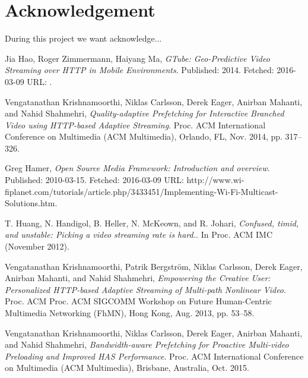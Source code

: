 \documentclass[9pt,a4paper]{acmproc}
\begin{document}
\section{Acknowledgement}
During this project we want acknowledge...

\clearpage
\begin{thebibliography}{9}

  Jia Hao, Roger Zimmermann, Haiyang Ma,
  \emph{GTube: Geo-Predictive Video Streaming over HTTP in Mobile Environments}.
  \newline
  Published: 2014. Fetched: 2016-03-09 
  \newline
	URL: .

  Vengatanathan Krishnamoorthi, Niklas Carlsson, Derek Eager, Anirban 
Mahanti, and Nahid Shahmehri,
  \emph{Quality-adaptive Prefetching for Interactive 
Branched Video using HTTP-based Adaptive Streaming}.
  \newline
  Proc. ACM 
International Conference on Multimedia (ACM Multimedia), Orlando, FL, Nov. 2014, pp. 317--326.

  Greg Hamer,
  \emph{Open Source Media Framework: Introduction and overview}.
  \newline
  Published: 2010-03-15. Fetched: 2016-03-09
 \newline
  URL: http://www.wi-fiplanet.com/tutorials/article.php/3433451/Implementing-Wi-Fi-Multicast-Solutions.htm.
  
  T. Huang, N. Handigol, B. Heller, N. McKeown, and R. Johari,
  \emph{Confused, timid, and unstable: Picking a video streaming rate is hard.}.
  \newline
  In Proc. ACM IMC (November 2012).
  
  Vengatanathan Krishnamoorthi, Patrik Bergström, Niklas Carlsson, Derek 
Eager, Anirban Mahanti, and Nahid Shahmehri,
  \emph{Empowering the Creative User: 
Personalized HTTP-based Adaptive Streaming of Multi-path Nonlinear Video}.
  \newline
  Proc. ACM 
Proc. ACM SIGCOMM Workshop on Future Human-Centric Multimedia Networking 
(FhMN), Hong Kong, Aug. 2013, pp. 53--58.

Vengatanathan Krishnamoorthi, Niklas Carlsson, Derek Eager, Anirban 
Mahanti, and Nahid Shahmehri,
	\emph{Bandwidth-aware Prefetching for Proactive 
Multi-video Preloading and Improved HAS Performance}.
	\newline
	Proc. ACM 
International Conference on Multimedia (ACM Multimedia), Brisbane, 
Australia, Oct. 2015.


\end{thebibliography}
\end{document}
